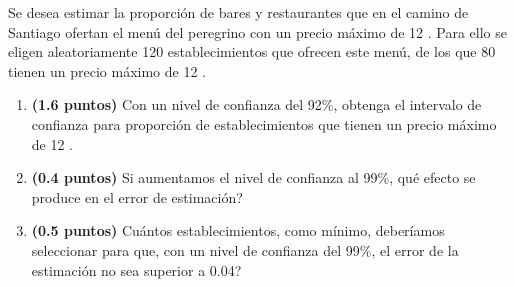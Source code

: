 
Se desea estimar la proporción de bares y restaurantes que en el camino de Santiago ofertan el menú del peregrino con un precio máximo de 12 \texteuro{}. Para ello se eligen aleatoriamente 120 establecimientos que ofrecen este menú, de los que 80 tienen un precio máximo de 12 \texteuro{}.
\begin{enumerate}[label=\alph*)]
\item \textbf{(1.6 puntos)} Con un nivel de confianza del 92\%, obtenga el intervalo de confianza para proporción de establecimientos que tienen un precio máximo de 12 \texteuro{}.
\item \textbf{(0.4 puntos)} Si aumentamos el nivel de confianza al 99\%, \textquestiondown{}qué efecto se produce en el error de estimación?
\item \textbf{(0.5 puntos)} \textquestiondown{}Cuántos establecimientos, como mínimo, deberíamos seleccionar para que, con un nivel de confianza del 99\%, el error de la estimación no sea superior a 0.04?
\end{enumerate}
